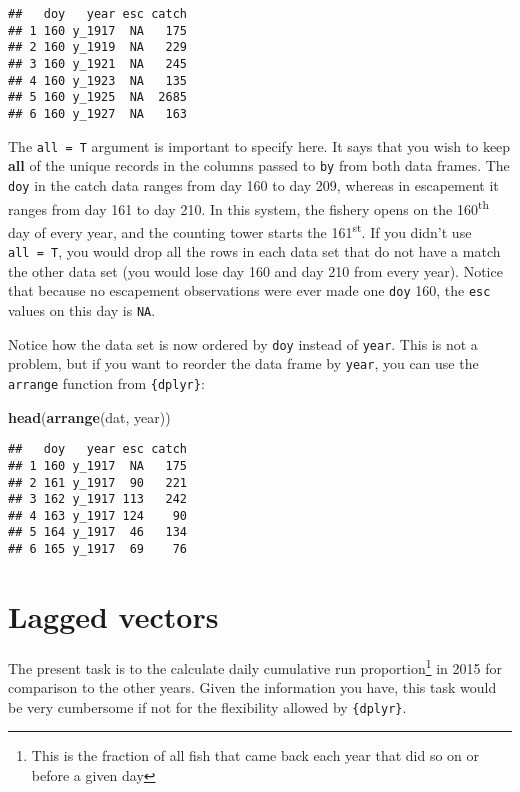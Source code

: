 \documentclass[]{book}
\newenvironment{Shaded}{\begin{snugshade}}{\end{snugshade}}
\newcommand{\KeywordTok}[1]{\textcolor[rgb]{0.13,0.29,0.53}{\textbf{#1}}}
\newcommand{\NormalTok}[1]{#1}
\let\rmarkdownfootnote\footnote%
\def\footnote{\protect\rmarkdownfootnote}
\theoremstyle{definition}
\theoremstyle{definition}
\theoremstyle{definition}
\theoremstyle{remark}
\begin{document}
\begin{verbatim}
##   doy   year esc catch
## 1 160 y_1917  NA   175
## 2 160 y_1919  NA   229
## 3 160 y_1921  NA   245
## 4 160 y_1923  NA   135
## 5 160 y_1925  NA  2685
## 6 160 y_1927  NA   163
\end{verbatim}

The \texttt{all\ =\ T} argument is important to specify here. It says
that you wish to keep \textbf{all} of the unique records in the columns
passed to \texttt{by} from both data frames. The \texttt{doy} in the
catch data ranges from day 160 to day 209, whereas in escapement it
ranges from day 161 to day 210. In this system, the fishery opens on the
160\textsuperscript{th} day of every year, and the counting tower starts
the 161\textsuperscript{st}. If you didn't use \texttt{all\ =\ T}, you
would drop all the rows in each data set that do not have a match the
other data set (you would lose day 160 and day 210 from every year).
Notice that because no escapement observations were ever made one
\texttt{doy} 160, the \texttt{esc} values on this day is \texttt{NA}.

Notice how the data set is now ordered by \texttt{doy} instead of
\texttt{year}. This is not a problem, but if you want to reorder the
data frame by \texttt{year}, you can use the \texttt{arrange} function
from \texttt{\{dplyr\}}:

\begin{Shaded}
\begin{Highlighting}[]
\KeywordTok{head}\NormalTok{(}\KeywordTok{arrange}\NormalTok{(dat, year))}
\end{Highlighting}
\end{Shaded}

\begin{verbatim}
##   doy   year esc catch
## 1 160 y_1917  NA   175
## 2 161 y_1917  90   221
## 3 162 y_1917 113   242
## 4 163 y_1917 124    90
## 5 164 y_1917  46   134
## 6 165 y_1917  69    76
\end{verbatim}

\section{Lagged vectors}\label{lagged-vectors}

The present task is to the calculate daily cumulative run
proportion\footnote{This is the fraction of all fish that came back each
  year that did so on or before a given day} in 2015 for comparison to
the other years. Given the information you have, this task would be very
cumbersome if not for the flexibility allowed by \texttt{\{dplyr\}}.
\end{document}
